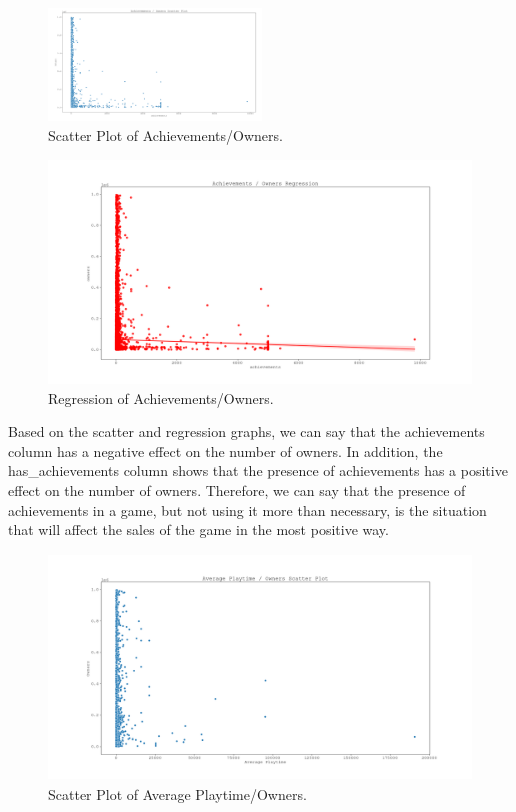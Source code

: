 \documentclass[conference]{IEEEtran}
\begin{document}
\begin{figure}[h]
  \includegraphics[width=\linewidth, height=3cm]{assets-2/achievements_owners_scatter.png}
  \caption{Scatter Plot of Achievements/Owners.}
  \label{fig:achievements_owners1}
\end{figure}
\FloatBarrier

\begin{figure}[h]
  \includegraphics[width=\linewidth]{assets-2/achievements_owners_regression.png}
  \caption{Regression of Achievements/Owners.}
  \label{fig:achievements_owners2}
\end{figure}
\FloatBarrier

Based on the scatter and regression graphs, we can say that the achievements column has a negative effect on the number of owners. In addition, the has\_achievements column shows that the presence of achievements has a positive effect on the number of owners. Therefore, we can say that the presence of achievements in a game, but not using it more than necessary, is the situation that will affect the sales of the game in the most positive way.

\begin{figure}[h]
  \includegraphics[width=\linewidth, height=6cm]{assets-2/average_playtime_owners_scatter.png}
  \caption{Scatter Plot of Average Playtime/Owners.}
  \label{fig:average_playtime_owners1}
\end{figure}
\FloatBarrier
\end{document}
